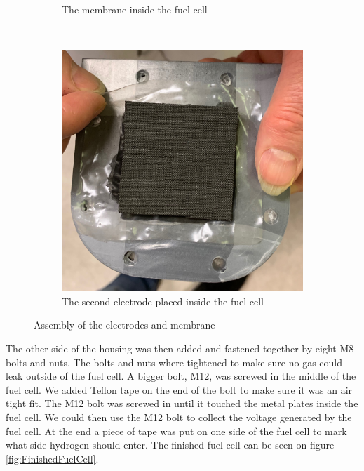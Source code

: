 \begin{figure}[ht]
\begin{subfigure}[b]{0.3\textwidth}
        \caption{The membrane inside the fuel cell}
        \label{fig:Membrane}
    \end{subfigure}
    ~ %
    \begin{subfigure}[b]{0.3\textwidth}
        \includegraphics[width=\textwidth]{DIV./Bilder/Assembly/Ass6.jpg}
        \caption{The second electrode placed inside the fuel cell}
        \label{fig:2Electrode}
    \end{subfigure}
    \caption{Assembly of the electrodes and membrane}\label{fig:ElectrodeMembraneAssembly}
\end{figure}

The other side of the housing was then added and fastened together by eight M8 bolts and nuts. The bolts and nuts where tightened to make sure no gas could leak outside of the fuel cell. A bigger bolt, M12, was screwed in the middle of the fuel cell. We added Teflon tape on the end of the bolt to make sure it was an air tight fit. The M12 bolt was screwed in until it touched the metal plates inside the fuel cell. We could then use the M12 bolt to collect the voltage generated by the fuel cell. At the end a piece of tape was put on one side of the fuel cell to mark what side hydrogen should enter. The finished fuel cell can be seen on figure \ref{fig:FinishedFuelCell}.


